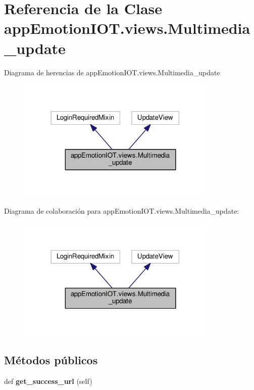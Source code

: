 \hypertarget{classappEmotionIOT_1_1views_1_1Multimedia__update}{}\section{Referencia de la Clase app\+Emotion\+I\+O\+T.\+views.\+Multimedia\+\_\+update}
\label{classappEmotionIOT_1_1views_1_1Multimedia__update}


Diagrama de herencias de app\+Emotion\+I\+O\+T.\+views.\+Multimedia\+\_\+update
\nopagebreak
\begin{figure}[H]
\begin{center}
\leavevmode
\includegraphics[width=270pt]{classappEmotionIOT_1_1views_1_1Multimedia__update__inherit__graph}
\end{center}
\end{figure}


Diagrama de colaboración para app\+Emotion\+I\+O\+T.\+views.\+Multimedia\+\_\+update\+:
\nopagebreak
\begin{figure}[H]
\begin{center}
\leavevmode
\includegraphics[width=270pt]{classappEmotionIOT_1_1views_1_1Multimedia__update__coll__graph}
\end{center}
\end{figure}
\subsection*{Métodos públicos}
\begin{DoxyCompactItemize}
\item 
def {\bfseries get\+\_\+success\+\_\+url} (self)\hypertarget{classappEmotionIOT_1_1views_1_1Multimedia__update_aaffa3b6f153cd2618b4923e2e537caa0}{}\label{classappEmotionIOT_1_1views_1_1Multimedia__update_aaffa3b6f153cd2618b4923e2e537caa0}

\end{DoxyCompactItemize}
